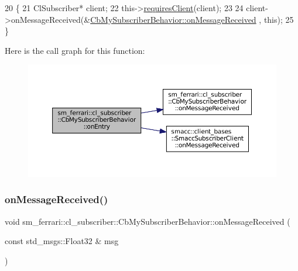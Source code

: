 \begin{DoxyCode}
20     \{
21         ClSubscriber* client;
22         this->\hyperlink{classsmacc_1_1ISmaccClientBehavior_a32b16e99e3b4cb289414203dc861a440}{requiresClient}(client);
23 
24         client->onMessageReceived(&\hyperlink{classsm__ferrari_1_1cl__subscriber_1_1CbMySubscriberBehavior_a9dcea2976705d72df667f747328eb7d6}{CbMySubscriberBehavior::onMessageReceived}
      , \textcolor{keyword}{this});
25     \}
\end{DoxyCode}
Here is the call graph for this function\+:
\nopagebreak
\begin{figure}[H]
\begin{center}
\leavevmode
\includegraphics[width=350pt]{classsm__ferrari_1_1cl__subscriber_1_1CbMySubscriberBehavior_a16c8c5e65f02bd76081c3dc13367776a_cgraph}
\end{center}
\end{figure}
\mbox{\label{classsm__ferrari_1_1cl__subscriber_1_1CbMySubscriberBehavior_a9dcea2976705d72df667f747328eb7d6}} 
\subsubsection{\texorpdfstring{on\+Message\+Received()}{onMessageReceived()}}
{\footnotesize\ttfamily void sm\+\_\+ferrari\+::cl\+\_\+subscriber\+::\+Cb\+My\+Subscriber\+Behavior\+::on\+Message\+Received (\begin{DoxyParamCaption}\item[{const std\+\_\+msgs\+::\+Float32 \&}]{msg }\end{DoxyParamCaption})\hspace{0.3cm}{\ttfamily [inline]}}



